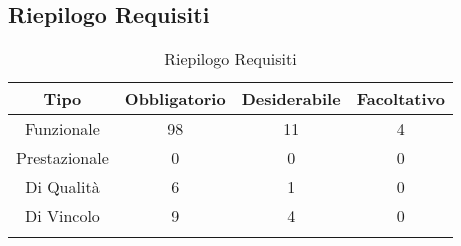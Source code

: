 \subsection{Riepilogo Requisiti}
\normalsize
\begingroup
\renewcommand\arraystretch{2}
\begin{longtable}{|c|c|c|c|}
\hline 
\textbf{Tipo} & \textbf{Obbligatorio} & \textbf{Desiderabile} & \textbf{Facoltativo}\\
\hline
Funzionale & 98 & 11 & 4\\ \hline
Prestazionale & 0 & 0 & 0\\ \hline
Di Qualità & 6 & 1 & 0\\ \hline
Di Vincolo & 9 & 4  & 0\\ \hline
\caption[Riepilogo Requisiti]{Riepilogo Requisiti}
\label{tabella:riepilogorequi}
\end{longtable}
\endgroup
\clearpage